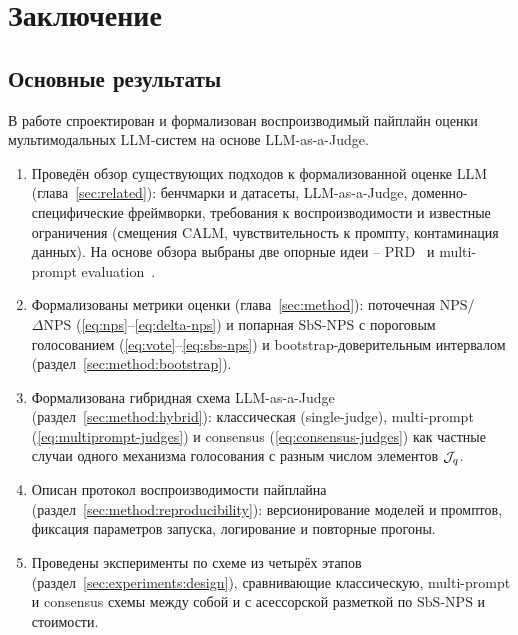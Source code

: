 \chapter{Заключение}
\label{sec:conclusion}

\section{Основные результаты}

В работе спроектирован и формализован воспроизводимый пайплайн оценки
мультимодальных LLM-систем на основе LLM-as-a-Judge.

\begin{enumerate}
    \item Проведён обзор существующих подходов к формализованной оценке
        LLM (глава~\ref{sec:related}): бенчмарки и датасеты,
        LLM-as-a-Judge, доменно-специфические фреймворки, требования к
        воспроизводимости и известные ограничения (смещения CALM,
        чувствительность к промпту, контаминация данных).
        На основе обзора выбраны две опорные идеи -- PRD~\cite{li2023prd}
        и multi-prompt evaluation~\cite{mizrahi2024stateofwhatart}.
    \item Формализованы метрики оценки (глава~\ref{sec:method}):
        поточечная $\mathrm{NPS}$/$\Delta\mathrm{NPS}$
        (\eqref{eq:nps}--\eqref{eq:delta-nps}) и попарная
        $\mathrm{SbS\text{-}NPS}$ с пороговым голосованием
        (\eqref{eq:vote}--\eqref{eq:sbs-nps}) и
        bootstrap-доверительным интервалом
        (раздел~\ref{sec:method:bootstrap}).
    \item Формализована гибридная схема LLM-as-a-Judge
        (раздел~\ref{sec:method:hybrid}): классическая (single-judge),
        multi-prompt (\eqref{eq:multiprompt-judges}) и consensus
        (\eqref{eq:consensus-judges}) как частные случаи одного
        механизма голосования с разным числом элементов $\mathcal{J}_q$.
    \item Описан протокол воспроизводимости пайплайна
        (раздел~\ref{sec:method:reproducibility}): версионирование
        моделей и промптов, фиксация параметров запуска, логирование и
        повторные прогоны.
    \item Проведены эксперименты по схеме из четырёх этапов
        (раздел~\ref{sec:experiments:design}), сравнивающие
        классическую, multi-prompt и consensus схемы между собой и с
        асессорской разметкой по $\mathrm{SbS\text{-}NPS}$ и стоимости.
\end{enumerate}

